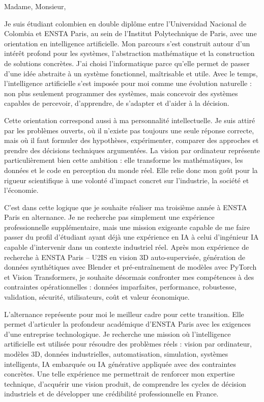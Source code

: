 \documentclass[10pt,a4paper]{article}
\begin{document}
{\small


Madame, Monsieur,

Je suis étudiant colombien en double diplôme entre l’Universidad Nacional de Colombia et ENSTA Paris, au sein de l’Institut Polytechnique de Paris, avec une orientation en intelligence artificielle. Mon parcours s’est construit autour d’un intérêt profond pour les systèmes, l’abstraction mathématique et la construction de solutions concrètes. J’ai choisi l’informatique parce qu’elle permet de passer d’une idée abstraite à un système fonctionnel, maîtrisable et utile. Avec le temps, l’intelligence artificielle s’est imposée pour moi comme une évolution naturelle : non plus seulement programmer des systèmes, mais concevoir des systèmes capables de percevoir, d’apprendre, de s’adapter et d’aider à la décision.

Cette orientation correspond aussi à ma personnalité intellectuelle. Je suis attiré par les problèmes ouverts, où il n’existe pas toujours une seule réponse correcte, mais où il faut formuler des hypothèses, expérimenter, comparer des approches et prendre des décisions techniques argumentées. La vision par ordinateur représente particulièrement bien cette ambition : elle transforme les mathématiques, les données et le code en perception du monde réel. Elle relie donc mon goût pour la rigueur scientifique à une volonté d’impact concret sur l’industrie, la société et l’économie.

C’est dans cette logique que je souhaite réaliser ma troisième année à ENSTA Paris en alternance. Je ne recherche pas simplement une expérience professionnelle supplémentaire, mais une mission exigeante capable de me faire passer du profil d’étudiant ayant déjà une expérience en IA à celui d’ingénieur IA capable d’intervenir dans un contexte industriel réel. Après mon expérience de recherche à ENSTA Paris – U2IS en vision 3D auto-supervisée, génération de données synthétiques avec Blender et pré-entraînement de modèles avec PyTorch et Vision Transformers, je souhaite désormais confronter mes compétences à des contraintes opérationnelles : données imparfaites, performance, robustesse, validation, sécurité, utilisateurs, coût et valeur économique.

L’alternance représente pour moi le meilleur cadre pour cette transition. Elle permet d’articuler la profondeur académique d’ENSTA Paris avec les exigences d’une entreprise technologique. Je recherche une mission où l’intelligence artificielle est utilisée pour résoudre des problèmes réels : vision par ordinateur, modèles 3D, données industrielles, automatisation, simulation, systèmes intelligents, IA embarquée ou IA générative appliquée avec des contraintes concrètes. Une telle expérience me permettrait de renforcer mon expertise technique, d’acquérir une vision produit, de comprendre les cycles de décision industriels et de développer une crédibilité professionnelle en France.

}
\end{document}
